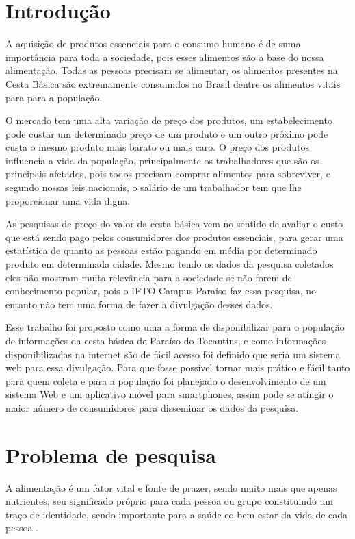\documentclass{ifto-tex}
\begin{document}
\textual

\chapter{Introdução}

A aquisição de produtos essenciais para o consumo humano é de suma importância para toda a sociedade, pois esses alimentos são a base do nossa alimentação. Todas as pessoas precisam se alimentar, os alimentos presentes na Cesta Básica são extremamente consumidos no Brasil dentre os alimentos vitais para para a população.

O mercado tem uma alta variação de preço dos produtos, um estabelecimento pode custar um determinado preço de um produto e um outro próximo pode custa o mesmo produto mais barato ou mais caro. O preço dos produtos influencia a vida da população, principalmente os trabalhadores que são os principais afetados, pois todos precisam comprar alimentos para sobreviver, e segundo nossas leis nacionais, o salário de um trabalhador tem que lhe proporcionar uma vida digna.

As pesquisas de preço do valor da cesta básica vem no sentido de avaliar o custo que está sendo pago pelos consumidores dos produtos essenciais, para gerar uma estatística de quanto as pessoas estão pagando em média por determinado produto em determinada cidade. Mesmo tendo os dados da pesquisa coletados eles não mostram muita relevância para a sociedade se não forem de conhecimento popular, pois o IFTO Campus Paraíso faz essa pesquisa, no entanto não tem uma forma de fazer a divulgação desses dados.

Esse trabalho foi proposto como uma a forma de disponibilizar para o população de informações da cesta básica de Paraíso do Tocantins, e como informações disponibilizadas na internet são de fácil acesso foi definido que seria um sistema web para essa divulgação. Para que fosse possível tornar mais prático e fácil tanto para quem coleta e para a população foi planejado o desenvolvimento de um sistema Web e um aplicativo móvel para smartphones, assim pode se atingir o maior número de consumidores para disseminar os dados da pesquisa.

	
	

\chapter{Problema de pesquisa}
	
		A alimentação é um fator vital e fonte de prazer, sendo muito mais que apenas nutrientes, seu significado próprio para cada pessoa ou grupo constituindo um traço de identidade, sendo importante para a saúde eo bem estar da vida de cada pessoa \cite{loureiro2004importancia}.
		
\end{document}

